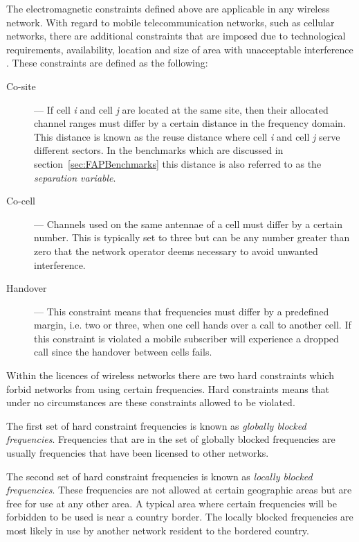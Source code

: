 The electromagnetic constraints defined above are applicable in any wireless network. With regard to mobile telecommunication networks, such as cellular networks, there are additional constraints that are imposed due to technological requirements, availability, location and size of area with unacceptable interference \cite{Karen2004,Eisenblatter,AndreasPaper}. These constraints are defined as the following:
\begin{description}
\item[Co-site] --- If cell \emph{i} and cell \emph{j} are located at the same site, then their allocated channel ranges must differ by a certain distance in the frequency domain. This distance is known as the reuse distance where cell \emph{i} and cell \emph{j} serve different sectors\cite{FixedFAPPSO,EgyptFAPPSO}. In the benchmarks which are discussed in section~\ref{sec:FAPBenchmarks} this distance is also referred to as the \emph{separation variable}. 
\item[Co-cell] --- Channels used on the same antennae of a cell must differ by a certain number. This is typically set to three but can be any number greater than zero that the network operator deems necessary to avoid unwanted interference\cite{Karen2004,Eisenblatter,AndreasPaper}.
\item[Handover] --- This constraint means that frequencies must differ by a predefined margin, i.e. two or three, when one cell hands over a call to another cell. If this constraint is violated a mobile subscriber will experience a dropped call since the handover between cells fails\cite{Karen2004,Eisenblatter,AndreasPaper}.
\end{description}

Within the licences of wireless networks there are two hard constraints which forbid networks from using certain frequencies. Hard constraints means that under no circumstances are these constraints allowed to be violated.

The first set of hard constraint frequencies is known as \emph{globally blocked frequencies}. Frequencies that are in the set of globally blocked frequencies are usually frequencies that have been licensed to other networks\cite{Karen2004,InterferenceOrientatedFAP}.

The second set of hard constraint frequencies is known as \emph{locally blocked frequencies}. These frequencies are not allowed at certain geographic areas but are free for use at any other area\cite{InterferenceOrientatedFAP}. A typical area where certain frequencies will be forbidden to be used is near a country border\cite{InterferenceOrientatedFAP}. The locally blocked frequencies are most likely in use by another network resident to the bordered country.

